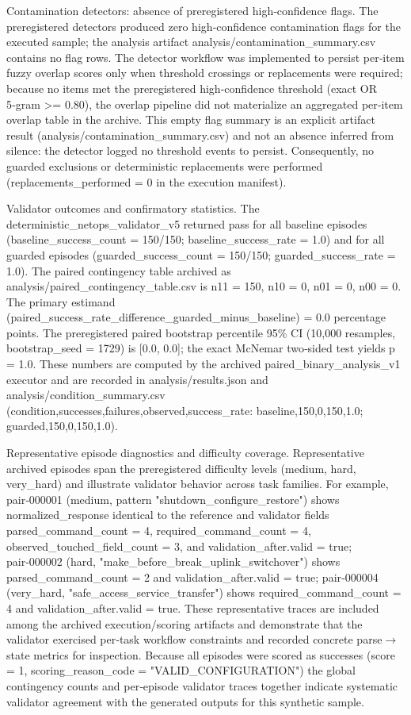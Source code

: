 \documentclass[conference]{IEEEtran}
\begin{document}
Contamination detectors: absence of preregistered high‑confidence flags. The preregistered detectors produced zero high‑confidence contamination flags for the executed sample; the analysis artifact analysis/contamination\_summary.csv contains no flag rows. The detector workflow was implemented to persist per‑item fuzzy overlap scores only when threshold crossings or replacements were required; because no items met the preregistered high‑confidence threshold (exact OR 5‑gram >= 0.80), the overlap pipeline did not materialize an aggregated per‑item overlap table in the archive. This empty flag summary is an explicit artifact result (analysis/contamination\_summary.csv) and not an absence inferred from silence: the detector logged no threshold events to persist. Consequently, no guarded exclusions or deterministic replacements were performed (replacements\_performed = 0 in the execution manifest).

Validator outcomes and confirmatory statistics. The deterministic\_netops\_validator\_v5 returned pass for all baseline episodes (baseline\_success\_count = 150/150; baseline\_success\_rate = 1.0) and for all guarded episodes (guarded\_success\_count = 150/150; guarded\_success\_rate = 1.0). The paired contingency table archived as analysis/paired\_contingency\_table.csv is n11 = 150, n10 = 0, n01 = 0, n00 = 0. The primary estimand (paired\_success\_rate\_difference\_guarded\_minus\_baseline) = 0.0 percentage points. The preregistered paired bootstrap percentile 95\% CI (10,000 resamples, bootstrap\_seed = 1729) is [0.0, 0.0]; the exact McNemar two‑sided test yields p = 1.0. These numbers are computed by the archived paired\_binary\_analysis\_v1 executor and are recorded in analysis/results.json and analysis/condition\_summary.csv (condition,successes,failures,observed,success\_rate: baseline,150,0,150,1.0; guarded,150,0,150,1.0).

Representative episode diagnostics and difficulty coverage. Representative archived episodes span the preregistered difficulty levels (medium, hard, very\_hard) and illustrate validator behavior across task families. For example, pair‑000001 (medium, pattern "shutdown\_configure\_restore") shows normalized\_response identical to the reference and validator fields parsed\_command\_count = 4, required\_command\_count = 4, observed\_touched\_field\_count = 3, and validation\_after.valid = true; pair‑000002 (hard, "make\_before\_break\_uplink\_switchover") shows parsed\_command\_count = 2 and validation\_after.valid = true; pair‑000004 (very\_hard, "safe\_access\_service\_transfer") shows required\_command\_count = 4 and validation\_after.valid = true. These representative traces are included among the archived execution/scoring artifacts and demonstrate that the validator exercised per‑task workflow constraints and recorded concrete parse\ensuremath{\rightarrow}state metrics for inspection. Because all episodes were scored as successes (score = 1, scoring\_reason\_code = "VALID\_CONFIGURATION") the global contingency counts and per‑episode validator traces together indicate systematic validator agreement with the generated outputs for this synthetic sample.
\end{document}
